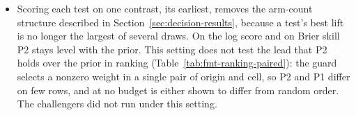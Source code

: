 \begin{itemize}
\item Scoring each test on one contrast, its earliest, removes the arm-count structure described in Section~\ref{sec:decision-results}, because a test's best lift is no longer the largest of several draws. On the log score and on Brier skill P2 stays level with the prior. This setting does not test the lead that P2 holds over the prior in ranking (Table~\ref{tab:fmt-ranking-paired}): the guard selects a nonzero weight in a single pair of origin and cell, so P2 and P1 differ on few rows, and at no budget is either shown to differ from random order. The challengers did not run under this setting.
\end{itemize}

\begin{table}[t]\centering\scriptsize
\caption{Leave-one-test-out set against forward chaining on the headline archive, pooled over origins and cells. Columns: P2 with the guard on and with the guard off. The row holds the paired log score per row, computed as forward chaining minus leave-one-test-out, together with its 90 percent bootstrap interval by test (500 resamples); a positive difference favours forward chaining.}
\label{tab:fmt-selection-rule}
\resizebox{\columnwidth}{!}{}
\end{table}

